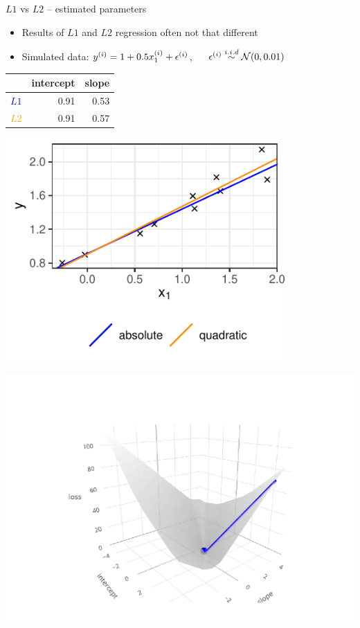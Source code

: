 \documentclass[11pt,compress,t,notes=noshow, xcolor=table]{beamer}
\begin{document}
\begin{vbframe}{$L1$ vs $L2$ -- estimated parameters}

\begin{itemize}
    \item Results of $L1$ and $L2$ regression often not that different
    \item Simulated data: $y^{(i)} = 1 + 0.5 x^{(i)}_1 + \epsilon^{(i)}$, ~~ $\epsilon^{(i)} \overset{i.i.d}{\sim}
    \mathcal{N}(0, 0.01)$
\end{itemize}
    
\vfill

\begin{minipage}[b]{0.65\textwidth}
    \hspace{0.7cm}
    \footnotesize
    \begin{tabular}{r|r|r}
        & intercept & slope \\ \hline
        \textcolor{blue}{$L1$} & 0.91 & 0.53 \\ \hline
        \textcolor{orange}{$L2$} & 0.91 & 0.57 
    \end{tabular}

    \vspace{0.5cm}
    \includegraphics[width=0.8\textwidth]{figure/reg_l1_comparison.pdf}
\end{minipage}
\begin{minipage}[b]{0.34\textwidth}
    \includegraphics[width=\textwidth, trim=80 0 100 80, clip]{
    figure/reg_l1_comparison_optim_abs.pdf}
    

\end{minipage}
\end{vbframe}
\end{document}
